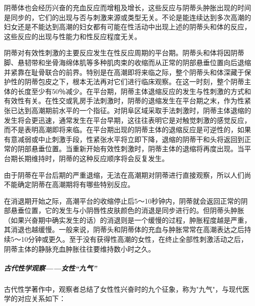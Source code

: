 \begin{enumerate}
阴蒂体也会经历兴奋的充血反应而增粗及增长，这些反应与阴蒂头肿胀出现的时间是同步的，它们的出现与否与刺激来源或类型无关。不论是能连续达到多次高潮的妇女还是不能达到高潮的妇女都有可能在性活动中出现上述的阴蒂头和体的反应，这些反应的出现与性能力和性反应程度无关。

阴蒂对有效性刺激的主要反应发生在性反应周期的平台期。阴蒂头和体将因阴蒂脚、悬韧带和坐骨海绵体肌等多种肌肉束的收缩而从正常的阴部悬垂位置向后退缩并紧靠在耻骨联合的前界。特别是在高潮即将来临之际，整个阴蒂头和体深藏于保护性的阴蒂包皮之下，根本无法再对它们进行临床观察。在这一时刻，整个阴蒂主体的长度至少有50％减少。在平台期，阴蒂主体退缩反应的发生与性刺激的方式和有效性有关。在性交或乳房手法刺激时，阴蒂的退缩发生在平台期之末，作为性紧张已达到高潮期前水平的一个指征。对阴阜区域采取手法刺激时，阴蒂主体退缩的发生将会更迅速，通常发生在平台早期，这往往表明它是对触觉刺激的感觉反应，而不是表明高潮即将来临。在平台期出现的阴蒂主体的退缩反应是可逆性的，如果有意减弱或中止刺激手段，性紧张水平将立即下降，退缩的阴蒂干和头将返回到正常的阴部悬垂位置。当重新开始有效性刺激时，阴蒂主体的退缩将再度出现。当平台期长期维持时，阴蒂的这种反应顺序将会反复发生。

由于阴蒂在平台后期的严重退缩，无法在高潮期对阴蒂进行直接观察，所以人们尚不能确定阴蒂在高潮期将有哪些特别反应。

在消退期开始之际，高潮平台的收缩停止后5～10秒钟内，阴蒂就会返回正常的阴部悬垂位置，它的发生与小阴唇性皮肤颜色的消退是同步进行的。但阴蒂头肿胀（如果兴奋期中确实发生的话）的消退则是一个缓慢的过程，肿胀程度越是严重，其消退也越缓慢。一般来说，阴蒂头和阴蒂体的充血与肿胀常常在高潮表达之后持续5～10分钟或更久。至于没有获得性高潮的女性，在终止全部性刺激活动之后，阴蒂主体的静脉充血肿胀往往要维持数小时之久。

\subparagraph{古代性学观察——女性“九气”}

古代性学著作中，观察者总结了女性性兴奋时的九个征象，称为"九气"，与现代医学的对应关系如下：


\end{enumerate}
